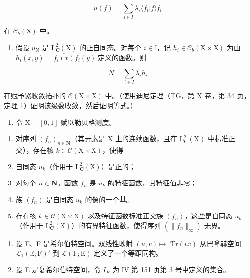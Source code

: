 \[
u (f) = \sum_ {i \in I} \lambda_ {i} \langle f _ {i} | f \rangle f _ {i}
\]

在 \(\mathcal{C}_b(\mathrm{X})\) 中。

\begin{enumerate}
\def\labelenumi{\alph{enumi})}
\setcounter{enumi}{4}
\tightlist
\item
  假设 \(u_{\mathrm{N}}\) 是 \(\mathrm{L}_{\mathbf{C}}^{2}(\mathrm{X})\) 的正自同态。对每个 \(i \in \mathrm{I}\)，记 \(h_i \in \mathcal{C}_b(\mathrm{X} \times \mathrm{X})\) 为由 \(h_i(x,y) = \overline{f_i(x)} f_i(y)\) 定义的函数。则
\end{enumerate}

\[
N = \sum_ {i \in I} \lambda_ {i} h _ {i}
\]

在赋予紧收敛拓扑的 \(\mathcal{C}(\mathrm{X}\times\mathrm{X})\) 中。（使用迪尼定理（TG，第 X 卷，第 34 页，定理 1）证明该级数收敛，然后证明等式。）

\begin{enumerate}
\def\labelenumi{\arabic{enumi})}
\setcounter{enumi}{15}
\tightlist
\item
  令 \(\mathrm{X} = [0,1]\) 赋以勒贝格测度。
\end{enumerate}

\begin{enumerate}
\def\labelenumi{\alph{enumi})}
\item
  对序列 \((f_n)_{n\in \mathbf{N}}\)（其元素是 X 上的连续函数，且在 \(\mathrm{L}_{\mathbf{C}}^2 (\mathrm{X})\) 中标准正交），存在核 \(k\in \mathcal{C}(\mathrm{X}\times \mathrm{X})\)，使得
\item
  自同态 \(u_{k}\)（作用于 \(\mathrm{L}_{\mathbf{C}}^{2}(\mathrm{X})\)）是正的；
\item
  对每个 \(n \in \mathbf{N}\)，函数 \(f_n\) 是 \(u_k\) 的特征函数，其特征值非零；
\item
  族 \((f_n)\) 是自同态 \(u_k\) 的像的一个基。
\item
  存在核 \(k \in \mathcal{C}(\mathrm{X} \times \mathrm{X})\) 以及特征函数标准正交族 \((f_n)\)，这些是自同态 \(u_k\)（作用于 \(\mathrm{L}_{\mathbf{C}}^2(\mathrm{X})\)）的有界特征函数，使得序列 \((\|f_n\|_\infty)\) 无界。
\end{enumerate}

\begin{enumerate}
\def\labelenumi{\arabic{enumi})}
\setcounter{enumi}{16}
\item
  设 E、F 是希尔伯特空间。双线性映射 \((u,v)\mapsto\) \(\mathrm{Tr}(uv)\) 从巴拿赫空间 \(\mathcal{L}_1(\mathrm{E};\mathrm{F})'\) 到 \(\mathcal{L}(\mathrm{F};\mathrm{E})\) 定义了一个等距同构。
\item
  设 E 是复希尔伯特空间，令 \(I_{E}\) 为 IV 第 151 页第 3 号中定义的集合。
\end{enumerate}

